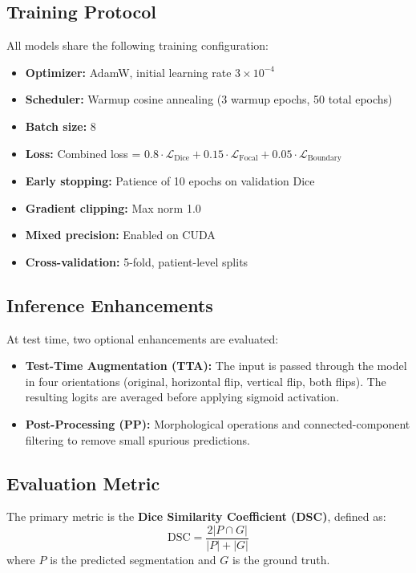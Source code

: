 \documentclass[11pt,a4paper]{article}
\begin{document}
\subsection{Training Protocol}

All models share the following training configuration:

\begin{itemize}
    \item \textbf{Optimizer:} AdamW, initial learning rate $3 \times 10^{-4}$
    \item \textbf{Scheduler:} Warmup cosine annealing (3 warmup epochs, 50 total epochs)
    \item \textbf{Batch size:} 8
    \item \textbf{Loss:} Combined loss = $0.8 \cdot \mathcal{L}_\text{Dice} + 0.15 \cdot \mathcal{L}_\text{Focal} + 0.05 \cdot \mathcal{L}_\text{Boundary}$
    \item \textbf{Early stopping:} Patience of 10 epochs on validation Dice
    \item \textbf{Gradient clipping:} Max norm 1.0
    \item \textbf{Mixed precision:} Enabled on CUDA
    \item \textbf{Cross-validation:} 5-fold, patient-level splits
\end{itemize}

\subsection{Inference Enhancements}

At test time, two optional enhancements are evaluated:
\begin{itemize}
    \item \textbf{Test-Time Augmentation (TTA):} The input is passed through the model in four orientations (original, horizontal flip, vertical flip, both flips). The resulting logits are averaged before applying sigmoid activation.
    \item \textbf{Post-Processing (PP):} Morphological operations and connected-component filtering to remove small spurious predictions.
\end{itemize}

\subsection{Evaluation Metric}

The primary metric is the \textbf{Dice Similarity Coefficient (DSC)}, defined as:
\[
\text{DSC} = \frac{2 |P \cap G|}{|P| + |G|}
\]
where $P$ is the predicted segmentation and $G$ is the ground truth.
\end{document}
